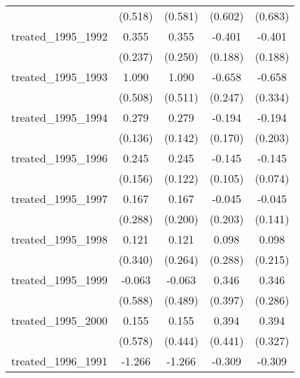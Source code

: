 {\begin{tabular}{l*{4}{c}}
            &     (0.518)         &     (0.581)         &     (0.602)         &     (0.683)         \\
[1em]
treated\_1995\_1992&       0.355         &       0.355         &      -0.401\sym{*}  &      -0.401\sym{*}  \\
            &     (0.237)         &     (0.250)         &     (0.188)         &     (0.188)         \\
[1em]
treated\_1995\_1993&       1.090\sym{*}  &       1.090\sym{*}  &      -0.658\sym{**} &      -0.658\sym{*}  \\
            &     (0.508)         &     (0.511)         &     (0.247)         &     (0.334)         \\
[1em]
treated\_1995\_1994&       0.279\sym{*}  &       0.279         &      -0.194         &      -0.194         \\
            &     (0.136)         &     (0.142)         &     (0.170)         &     (0.203)         \\
[1em]
treated\_1995\_1996&       0.245         &       0.245\sym{*}  &      -0.145         &      -0.145         \\
            &     (0.156)         &     (0.122)         &     (0.105)         &     (0.074)         \\
[1em]
treated\_1995\_1997&       0.167         &       0.167         &      -0.045         &      -0.045         \\
            &     (0.288)         &     (0.200)         &     (0.203)         &     (0.141)         \\
[1em]
treated\_1995\_1998&       0.121         &       0.121         &       0.098         &       0.098         \\
            &     (0.340)         &     (0.264)         &     (0.288)         &     (0.215)         \\
[1em]
treated\_1995\_1999&      -0.063         &      -0.063         &       0.346         &       0.346         \\
            &     (0.588)         &     (0.489)         &     (0.397)         &     (0.286)         \\
[1em]
treated\_1995\_2000&       0.155         &       0.155         &       0.394         &       0.394         \\
            &     (0.578)         &     (0.444)         &     (0.441)         &     (0.327)         \\
[1em]
treated\_1996\_1991&      -1.266         &      -1.266         &      -0.309         &      -0.309         \\

\end{tabular}}
